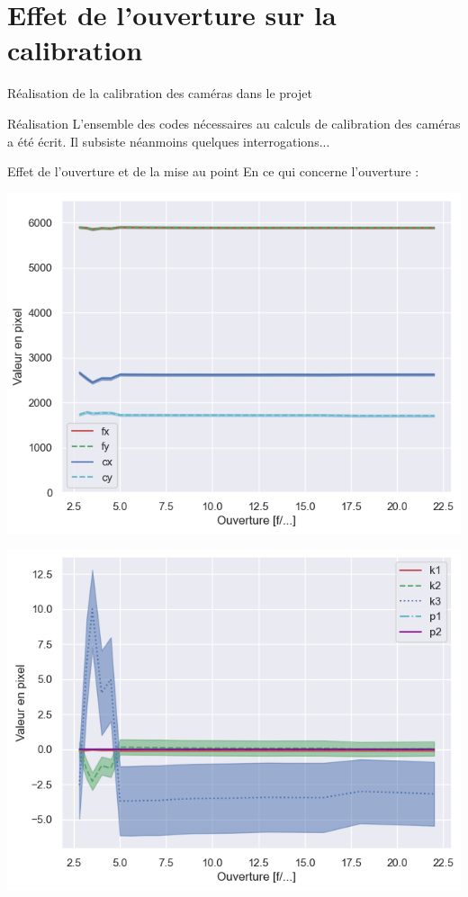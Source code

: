 \documentclass[8pt]{beamer}
\newcommand{\backupend}{
	\addtocounter{framenumberappendix}{-\value{framenumber}}
	\addtocounter{framenumber}{\value{framenumberappendix}} 
}
\begin{document}
\section*{Effet de l'ouverture sur la calibration}
	\begin{frame}{Réalisation de la calibration des caméras dans le projet}
		\begin{block}{Réalisation}
			L'ensemble des codes nécessaires au calculs de calibration des caméras a été écrit. Il subsiste néanmoins quelques interrogations...
		\end{block}
		\begin{block}{Effet de l'ouverture et de la mise au point}
			En ce qui concerne l'ouverture :\\
			\begin{minipage}[c]{.48\textwidth}\centering
				\includegraphics[width=\textwidth]{camera_matrix_aperture.png}
			\end{minipage}\hfill
			\begin{minipage}[c]{.48\textwidth}\centering
				\includegraphics[width=\textwidth]{distortion_coeffs_aperture.png}
			\end{minipage}
		\end{block}
	\end{frame}
	
\backupend
\end{document}
